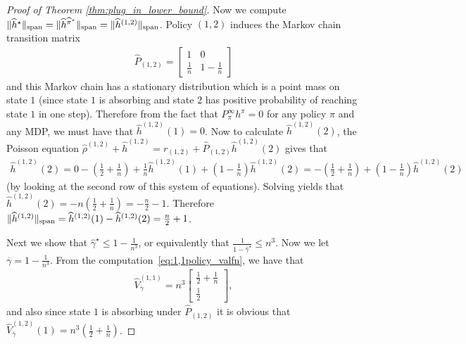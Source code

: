 \documentclass{article}
\theoremstyle{plain}
\theoremstyle{plain}
\theoremstyle{remark}
\theoremstyle{plain}
\theoremstyle{plain}
\newcommand{\Phat}{\widehat{P}}
\newcommand{\Vhat}{\widehat{V}}
\newcommand{\pihstar}{\widehat{\pi}^\star}
\newcommand{\rhohat}{\widehat{\rho}}
\newcommand{\hhat}{\widehat{h}}
\newcommand{\gammared}{{\overline{\gamma}}}
\newcommand{\empbod}{\widehat{\gamma}^\star}
\begin{document}
\begin{proof}[Proof of Theorem \ref{thm:plug_in_lower_bound}]
Now we compute $\spannorm{\hhat^\star} = \spannorm{\hhat^{\pihstar}} = \spannorm{\hhat^{(1,2)}}$. Policy $(1,2)$ induces the Markov chain transition matrix
\begin{align*}
    \Phat_{(1,2)} = \begin{bmatrix}
        1 & 0 \\
    \frac{1}{n} & 1-\frac{1}{n}
    \end{bmatrix}
\end{align*}
and this Markov chain has a stationary distribution which is a point mass on state $1$ (since state $1$ is absorbing and state $2$ has positive probability of reaching state $1$ in one step). Therefore from the fact that $P_{\pi}^\infty h^\pi = 0$ for any policy $\pi$ and any MDP, we must have that $\hhat^{(1,2)}(1) = 0$. Now to calculate $\hhat^{(1,2)}(2)$, the Poisson equation $\rhohat^{(1,2)} + \hhat^{(1,2)} = r_{(1,2)} + \Phat_{(1,2)} \hhat^{(1,2)}(2)$ gives that
\begin{align*}
    \hhat^{(1,2)}(2) = 0 - \left(\frac{1}{2} + \frac{1}{n}\right) + \frac{1}{n}\hhat^{(1,2)}(1) +\left(1 - \frac{1}{n}\right)\hhat^{(1,2)}(2) = - \left(\frac{1}{2} + \frac{1}{n}\right)  +\left(1 - \frac{1}{n}\right)\hhat^{(1,2)}(2)
\end{align*}
(by looking at the second row of this system of equations). Solving yields that $\hhat^{(1,2)}(2) = -n(\frac{1}{2} + \frac{1}{n}) = -\frac{n}{2} - 1$. Therefore $\spannorm{\hhat^{(1,2)}} = \hhat^{(1,2)}(1) - \hhat^{(1,2)}(2) = \frac{n}{2}+1$.

Next we show that $\empbod \leq 1 - \frac{1}{n^3}$, or equivalently that $\frac{1}{1-\empbod} \leq n^3$. Now we let $\gammared = 1-\frac{1}{n^3}$. From the computation~\eqref{eq:1,1policy_valfn}, we have that
\begin{align*}
    \Vhat_{\gammared}^{(1,1)} = n^3\begin{bmatrix}
    \frac{1}{2} + \frac{1}{n } \\ \frac{1}{2} 
\end{bmatrix},
\end{align*}
and also since state $1$ is absorbing under $\Phat_{(1,2)}$ it is obvious that $\Vhat^{(1,2)}_{\gammared}(1) = n^3 \left( \frac{1}{2} + \frac{1}{n }\right)$. 


\end{proof}
\end{document}
